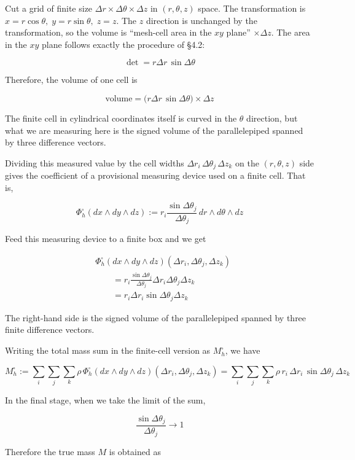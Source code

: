 \documentclass[a4paper,12pt,openany]{book}
\begin{document}
Cut a grid of finite size
\(\Delta r \times \Delta\theta \times \Delta z\) in \((r,\theta,z)\)
space. The transformation is
\(x = r\cos\theta,\; y = r\sin\theta,\; z = z\). The \(z\) direction is
unchanged by the transformation, so the volume is ``mesh-cell area in
the \(xy\) plane'' \(\times \Delta z\). The area in the \(xy\) plane
follows exactly the procedure of §4.2:

\[\det = r\Delta r\,\sin\Delta\theta\]

Therefore, the volume of one cell is

\[\text{volume} = \bigl(r\Delta r\,\sin\Delta\theta\bigr) \times \Delta z\]

The finite cell in cylindrical coordinates itself is curved in the
\(\theta\) direction, but what we are measuring here is the signed
volume of the parallelepiped spanned by three difference vectors.

Dividing this measured value by the cell widths
\(\Delta r_i\,\Delta\theta_j\,\Delta z_k\) on the \((r,\theta,z)\) side
gives the coefficient of a provisional measuring device used on a finite
cell. That is,

\[
\Phi_h^\square(dx\wedge dy\wedge dz)
:=
r_i\frac{\sin\Delta\theta_j}{\Delta\theta_j}\,dr\wedge d\theta\wedge dz
\]

Feed this measuring device to a finite box and we get

\[
\begin{aligned}
&\Phi_h^\square(dx\wedge dy\wedge dz)
(\Delta r_i,\Delta\theta_j,\Delta z_k)\\
&\qquad =
r_i\frac{\sin\Delta\theta_j}{\Delta\theta_j}
\Delta r_i\Delta\theta_j\Delta z_k \\
&\qquad =
r_i\Delta r_i\sin\Delta\theta_j\Delta z_k
\end{aligned}
\]

The right-hand side is the signed volume of the parallelepiped spanned
by three finite difference vectors.

Writing the total mass sum in the finite-cell version as
\(M_h^\square\), we have

\[
M_h^\square
:=
\sum_i\sum_j\sum_k
\rho\,
\Phi_h^\square(dx\wedge dy\wedge dz)(\Delta r_i,\Delta\theta_j,\Delta z_k)
=
\sum_i\sum_j\sum_k
\rho\,r_i\,\Delta r_i\,\sin\Delta\theta_j\,\Delta z_k
\]

In the final stage, when we take the limit of the sum,

\[
\frac{\sin\Delta\theta_j}{\Delta\theta_j}\to 1
\]

Therefore the true mass \(M\) is obtained as
\end{document}
